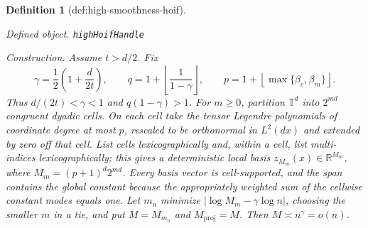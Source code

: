 \documentclass{article}
\newtheorem{definition}{Definition}
\begin{document}
\begin{definition}[def:high-smoothness-hoif]\label{def:high-smoothness-hoif}
\par\smallskip\noindent\emph{Defined object.} \texttt{highHoifHandle}
\par\smallskip\noindent\emph{Construction.} Assume \(t>d/2\).  Fix
\[
 \gamma=\frac12\left(1+\frac{d}{2t}\right),
 \qquad
 q=1+\left\lfloor\frac{1}{1-\gamma}\right\rfloor,
 \qquad
 p=1+\left\lfloor\max\{\beta_e,\beta_m\}\right\rfloor .
\]
Thus \(d/(2t)<\gamma<1\) and \(q(1-\gamma)>1\).  For \(m\geq0\), partition \(\mathbb T^d\) into \(2^{md}\) congruent dyadic cells.  On each cell take the tensor Legendre polynomials of coordinate degree at most \(p\), rescaled to be orthonormal in \(L^2(dx)\) and extended by zero off that cell.  List cells lexicographically and, within a cell, list multi-indices lexicographically; this gives a deterministic local basis \(z_{M_m}(x)\in\mathbb R^{M_m}\), where \(M_m=(p+1)^d2^{md}\).  Every basis vector is cell-supported, and the span contains the global constant because the appropriately weighted sum of the cellwise constant modes equals one.  Let \(m_n\) minimize \(|\log M_m-\gamma\log n|\), choosing the smaller \(m\) in a tie, and put \(M=M_{m_n}\) and \(M_{\mathrm{proj}}=M\).  Then \(M\asymp n^\gamma=o(n)\).


\end{definition}
\end{document}
